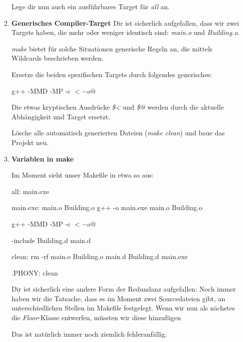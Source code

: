 \begin{enumerate}
Lege dir nun auch ein ausführbares Target für \emph{all} an.





\item\textbf{Generisches Compiler-Target}
Dir ist sicherlich aufgefallen, dass wir zwei Targets haben, die mehr oder weniger identisch sind: \emph{main.o} und \emph{Building.o}.

\emph{make} bietet für solche Situationen generische Regeln an, die mittels Wildcards beschrieben werden.

Ersetze die beiden spezifischen Targets durch folgendes generisches:
\begin{lstmake}
	g++ -MMD -MP -c $< -o $@
\end{lstmake}
Die etwas kryptischen Ausdrücke \emph{\$<} und \emph{\$@} werden durch die aktuelle Abhängigkeit und Target ersetzt.

Lösche alle automatisch generierten Dateien (\emph{make clean}) und baue das Projekt neu.





\item\textbf{Variablen in make}

Im Moment sieht unser Makefile in etwa so aus:
\begin{lstmake}
all: main.exe

main.exe: main.o Building.o
	g++ -o main.exe main.o Building.o

	g++ -MMD -MP -c $< -o $@

-include Building.d main.d

clean:
	rm -rf main.o Building.o main.d Building.d main.exe
	
.PHONY: clean
\end{lstmake}

Dir ist sicherlich eine andere Form der Redundanz aufgefallen:
Noch immer haben wir die Tatsache, dass es im Moment zwei Sourcedateien gibt, an unterschiedlichen Stellen im Makefile festgelegt.
Wenn wir nun als nächstes die \emph{Floor}-Klasse entwerfen, müssten wir diese hinzufügen
Das ist natürlich immer noch ziemlich fehleranfällig.


\end{enumerate}
